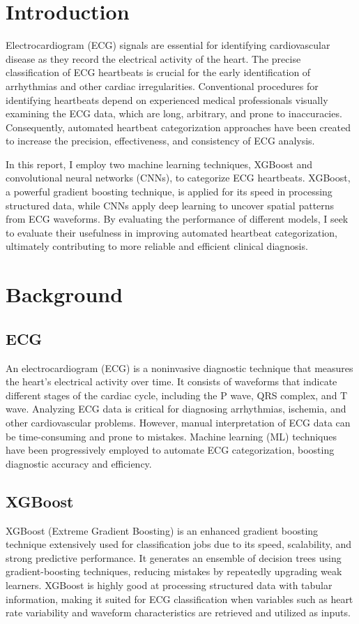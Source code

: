 \section{Introduction}
\indent \indent
Electrocardiogram (ECG) signals are essential for identifying cardiovascular disease as they record the electrical activity of the heart. The precise classification of ECG heartbeats is crucial for the early identification of arrhythmias and other cardiac irregularities. Conventional procedures for identifying heartbeats depend on experienced medical professionals visually examining the ECG data, which are long, arbitrary, and prone to inaccuracies. Consequently, automated heartbeat categorization approaches have been created to increase the precision, effectiveness, and consistency of ECG analysis.

\indent In this report, I employ two machine learning techniques, XGBoost and convolutional neural networks (CNNs), to categorize ECG heartbeats. XGBoost, a powerful gradient boosting technique, is applied for its speed in processing structured data, while CNNs apply deep learning to uncover spatial patterns from ECG waveforms. By evaluating the performance of different models, I seek to evaluate their usefulness in improving automated heartbeat categorization, ultimately contributing to more reliable and efficient clinical diagnosis.

\section{Background}
\subsection{ECG}
\indent \indent An electrocardiogram (ECG) is a noninvasive diagnostic technique that measures the heart's electrical activity over time.  It consists of waveforms that indicate different stages of the cardiac cycle, including the P wave, QRS complex, and T wave.  Analyzing ECG data is critical for diagnosing arrhythmias, ischemia, and other cardiovascular problems.  However, manual interpretation of ECG data can be time-consuming and prone to mistakes.  Machine learning (ML) techniques have been progressively employed to automate ECG categorization, boosting diagnostic accuracy and efficiency.

\subsection{XGBoost}
\indent \indent XGBoost (Extreme Gradient Boosting) is an enhanced gradient boosting technique extensively used for classification jobs due to its speed, scalability, and strong predictive performance.  It generates an ensemble of decision trees using gradient-boosting techniques, reducing mistakes by repeatedly upgrading weak learners.  XGBoost is highly good at processing structured data with tabular information, making it suited for ECG classification when variables such as heart rate variability and waveform characteristics are retrieved and utilized as inputs.


